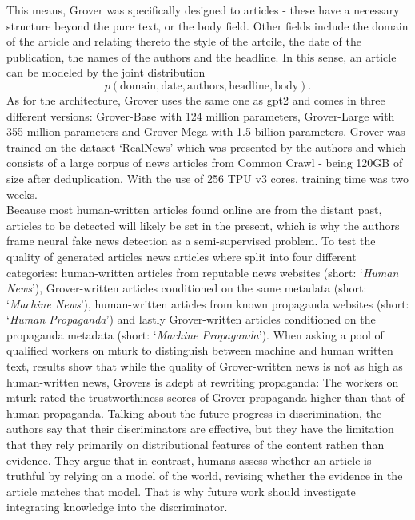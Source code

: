 This means, Grover was specifically designed to articles - these have a necessary structure beyond the pure text, or the body field. Other fields include the domain of the article and relating thereto the style of the artcile, the date of the publication, the names of the authors and the headline. In this sense, an article can be modeled by the joint distribution
\begin{equation}
	p(\text{domain}, \text{date}, \text{authors}, \text{headline}, \text{body}).
\end{equation}
As for the architecture, Grover uses the same one as \gls{gpt2} and comes in three different versions: Grover-Base with 124 million parameters, Grover-Large with 355 million parameters and Grover-Mega with 1.5 billion parameters. Grover was trained on the dataset `RealNews' which was presented by the authors and which consists of a large corpus of news articles from Common Crawl - being 120GB of size after deduplication. With the use of 256 TPU v3 cores, training time was two weeks. \\
Because most human-written articles found online are from the distant past, articles to be detected will likely be set in the present, which is why the authors frame neural fake news detection as a semi-supervised problem. To test the quality of generated articles news articles where split into four different categories: human-written articles from reputable news websites (short: `\textit{Human News}'), Grover-written articles conditioned on the same metadata (short: `\textit{Machine News}'), human-written articles from known propaganda websites (short: `\textit{Human Propaganda}') and lastly Grover-written articles conditioned on the propaganda metadata (short: `\textit{Machine Propaganda}'). When asking a pool of qualified workers on \gls{mturk} to distinguish between machine and human written text, results show that while the quality of Grover-written news is not as high as human-written news, Grovers is adept at rewriting propaganda: The workers on \gls{mturk} rated the trustworthiness scores of Grover propaganda higher than that of human propaganda. Talking about the future progress in discrimination, the authors say that their discriminators are effective, but they have the limitation that they rely primarily on distributional features of the content rathen than evidence. They argue that in contrast, humans assess whether an article is truthful by relying on a model of the world, revising whether the evidence in the article matches that model. That is why future work should investigate integrating knowledge into the discriminator.
